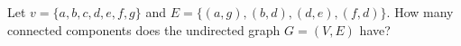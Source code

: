 \begin{prob}
    Let $v = \{a, b, c, d, e, f, g\}$ and $E = \{(a,g), (b,d), (d, e), (f, d)\}$.
    How many connected components does the undirected graph $G =(V, E)$ have?


\end{prob}
